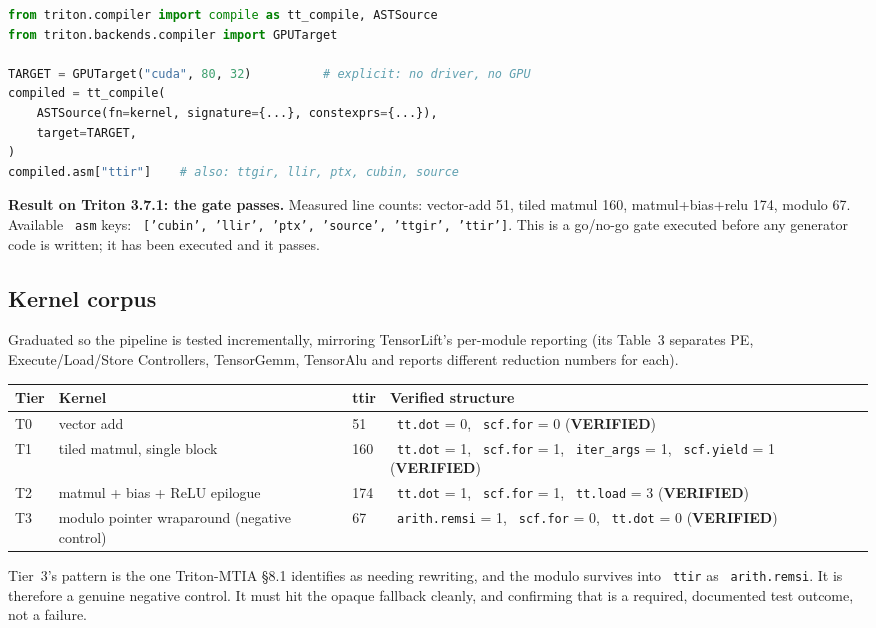 \documentclass[11pt,a4paper]{article}
\newcommand{\code}[1]{\texttt{\small\hyphenchar\font=45 #1}}
\newcommand{\verified}{\textbf{\textcolor{green!45!black}{VERIFIED}}}
\begin{document}
\begin{lstlisting}[language=Python]
from triton.compiler import compile as tt_compile, ASTSource
from triton.backends.compiler import GPUTarget

TARGET = GPUTarget("cuda", 80, 32)          # explicit: no driver, no GPU
compiled = tt_compile(
    ASTSource(fn=kernel, signature={...}, constexprs={...}),
    target=TARGET,
)
compiled.asm["ttir"]    # also: ttgir, llir, ptx, cubin, source
\end{lstlisting}

\noindent\textbf{Result on Triton 3.7.1: the gate passes.} Measured line counts:
vector-add 51, tiled matmul 160, matmul+bias+relu 174, modulo 67. Available \code{asm} keys:
\code{['cubin', 'llir', 'ptx', 'source', 'ttgir', 'ttir']}. This is a go/no-go gate executed before any
generator code is written; it has been executed and it passes.

\subsection{Kernel corpus}

Graduated so the pipeline is tested incrementally, mirroring TensorLift's per-module reporting (its Table~3
separates PE, Execute/Load/Store Controllers, TensorGemm, TensorAlu and reports different reduction numbers
for each).

\begin{center}
\begin{tabularx}{\textwidth}{@{}l >{\raggedright\arraybackslash}X l >{\raggedright\arraybackslash}p{3.9cm}@{}}
\toprule
\textbf{Tier} & \textbf{Kernel} & \textbf{ttir} & \textbf{Verified structure} \\
\midrule
T0 & vector add & 51 & \code{tt.dot} = 0, \code{scf.for} = 0 (\verified) \\
T1 & tiled matmul, single block & 160 & \code{tt.dot} = 1, \code{scf.for} = 1, \code{iter\_args} = 1, \code{scf.yield} = 1 (\verified) \\
T2 & matmul + bias + ReLU epilogue & 174 & \code{tt.dot} = 1, \code{scf.for} = 1, \code{tt.load} = 3 (\verified) \\
T3 & modulo pointer wraparound (negative control) & 67 & \code{arith.remsi} = 1, \code{scf.for} = 0, \code{tt.dot} = 0 (\verified) \\
\bottomrule
\end{tabularx}
\end{center}

\noindent Tier~3's pattern is the one Triton-MTIA \S8.1 identifies as needing rewriting, and the modulo
survives into \code{ttir} as \code{arith.remsi}. It is therefore a genuine negative control. It must hit the
opaque fallback cleanly, and confirming that is a required, documented test outcome, not a failure.
\end{document}
